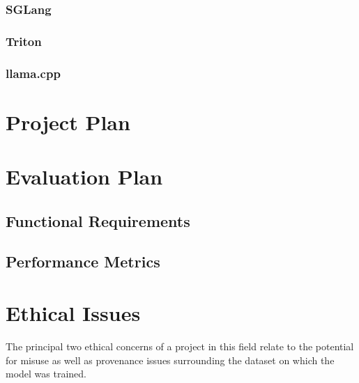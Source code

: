 \documentclass[12pt,twoside]{report}
\begin{document}
\subsection{SGLang}
\subsection{Triton}
\subsection{llama.cpp} \label{section:llamacpp}


\chapter{Project Plan} %

\chapter{Evaluation Plan} %
\begin{comment}
1. Run some benchmark on llama.cpp
2. Run same benchmark on llama.cpp + my system
3. ...
4. Profit???

Key requirements for project

Areas on which I could track performance relative to existing system
- Efficiency (\% of overall resources used)
- Throughput (tokens/sec)
\end{comment}

\section{Functional Requirements}
\section{Performance Metrics}


\chapter{Ethical Issues} %
The principal two ethical concerns of a project in this field relate to the potential for misuse as well as provenance issues surrounding the dataset on which the model was trained.
\end{document}
